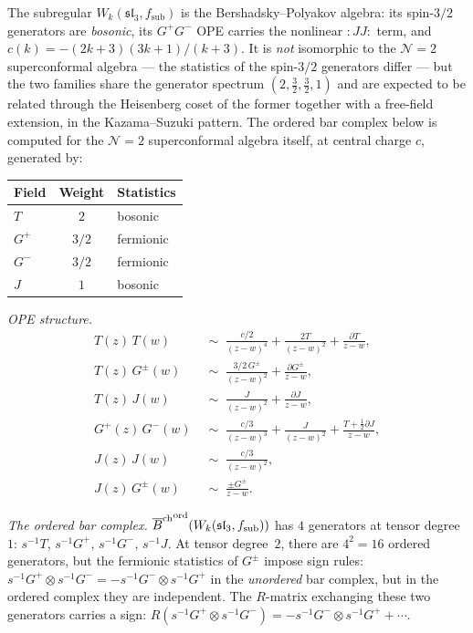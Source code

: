 \begin{conjecture}[Ordered bar complex for the
$\mathcal N=2$ superconformal algebra;
\ClaimStatusConjectured]
The subregular $W_k(\mathfrak{sl}_3,f_{\mathrm{sub}})$ is the
Bershadsky--Polyakov algebra: its spin-$3/2$ generators are
\emph{bosonic}, its $G^+G^-$ OPE carries the nonlinear
${:}JJ{:}$ term, and
$c(k)=-(2k+3)(3k+1)/(k+3)$. It is \emph{not} isomorphic to the
$\mathcal N=2$ superconformal algebra --- the statistics of the
spin-$3/2$ generators differ --- but the two families share the
generator spectrum $(2,\tfrac32,\tfrac32,1)$ and are expected to
be related through the Heisenberg coset of the former together
with a free-field extension, in the Kazama--Suzuki pattern. The
ordered bar complex below is computed for the $\mathcal N=2$
superconformal algebra itself, at central charge $c$, generated
by:
\begin{center}
\renewcommand{\arraystretch}{1.15}
\begin{tabular}{lcl}
\textbf{Field} & \textbf{Weight} & \textbf{Statistics} \\
\hline
$T$ & $2$ & bosonic \\
$G^+$ & $3/2$ & fermionic \\
$G^-$ & $3/2$ & fermionic \\
$J$ & $1$ & bosonic
\end{tabular}
\end{center}

\emph{OPE structure.}
\begin{align*}
T(z)\,T(w)&\;\sim\;\frac{c/2}{(z{-}w)^4}
+\frac{2T}{(z{-}w)^2}+\frac{\partial T}{z{-}w},\\
T(z)\,G^\pm(w)&\;\sim\;\frac{3/2\,G^\pm}{(z{-}w)^2}
+\frac{\partial G^\pm}{z{-}w},\\
T(z)\,J(w)&\;\sim\;\frac{J}{(z{-}w)^2}
+\frac{\partial J}{z{-}w},\\
G^+(z)\,G^-(w)&\;\sim\;\frac{c/3}{(z{-}w)^3}
+\frac{J}{(z{-}w)^2}
+\frac{T+\frac12\partial J}{z{-}w},\\
J(z)\,J(w)&\;\sim\;\frac{c/3}{(z{-}w)^2},\\
J(z)\,G^\pm(w)&\;\sim\;\frac{\pm G^\pm}{z{-}w}.
\end{align*}

\emph{The ordered bar complex.}
${\overline{B}^{\mathrm{ch}}}^{\mathrm{ord}}(W_k(\mathfrak{sl}_3,f_{\mathrm{sub}}))$
has $4$ generators at tensor degree~$1$:
$s^{-1}T$, $s^{-1}G^+$, $s^{-1}G^-$, $s^{-1}J$.
At tensor degree~$2$, there are $4^2=16$ ordered generators,
but the fermionic statistics of $G^\pm$ impose sign rules:
$s^{-1}G^+\otimes s^{-1}G^-=-s^{-1}G^-\otimes s^{-1}G^+$
in the \emph{unordered} bar complex, but in the ordered
complex they are independent. The $R$-matrix exchanging
these two generators carries a sign:
$R(s^{-1}G^+\otimes s^{-1}G^-)
=-s^{-1}G^-\otimes s^{-1}G^++\cdots$.


\end{conjecture}
